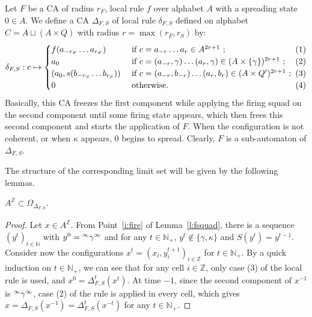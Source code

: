 \documentclass{jac}
\newcommand{\Z}{\mathbb Z}
\newcommand{\N}{\mathbb N}
\newcommand{\Ns}{\N_+}
\newcommand{\az}{{A^\Z}}
\newcommand{\dinf}[1]{\vphantom{#1}^\infty{#1}^\infty}
\theoremstyle{definition}
\begin{document}
Let $F$ be a CA of radius $r_F$, local rule $f$ over alphabet $A$ with a
spreading state $0\in A$. We define a CA $\Delta_{F,S}$ of local rule
$\delta_{F,S}$ defined on alphabet $C=A\sqcup(A\times Q)$ with radius
$r=\max(r_F,r_S)$ by:
\[
\delta_{F,S}:c\mapsto
    \begin{cases}
      f(a_{-r_F}\ldots a_{r_F})&\text{ if }c=a_{-r}\ldots a_r\in A^{2r+1}~;\hfill \text{ (1)}\\
      a_0&\text{ if }c=(a_{-r},\gamma)\ldots(a_r,\gamma)\in(A\times\{\gamma\})^{2r+1}~;\hfill \text{ (2)}\\
      (a_0,s(b_{-r_S}\ldots b_{r_S}))&\text{ if }c=(a_{-r},b_{-r})\ldots(a_r,b_r)\in(A\times Q')^{2r+1}~;\hfill \text{ (3)}\\
      0&\text{ otherwise}.\hfill \text{ (4)}
    \end{cases}
\]
Basically, this CA freezes the first component while applying the firing squad on the second component until some firing state appears, which then frees this second component and starts the application of $F$. When the configuration is not coherent, or when $\kappa$ appears, $0$ begins to spread.
Clearly, $F$ is a sub-automaton of $\Delta_{F,S}$.

The structure of the corresponding limit set will be given by the following lemmas.
\begin{lem}\label{l:sigomeg}
$\az\subset\Omega_{\Delta_{F,S}}$.
\end{lem}
\begin{proof}
Let $x\in\az$. From Point~\ref{i:fire} of Lemma~\ref{l:fsquad}, there is a sequence $(y^t)_{t\in\N}$ with $y^0=\dinf\gamma$ and for any $t\in\Ns$, $y^t\notin\{\gamma,\kappa\}$ and $S(y^t)=y^{t-1}$.
Consider now the configurations $x^t=(x_i,y^{t+1}_i)_{i\in\Z}$ for $t\in\Ns$.
By a quick induction on $t\in\Ns$, we can see that for any cell $i\in\Z$, only case (3) of the local rule is used, and $x^0=\Delta_{F,S}^t(x^t)$. At time $-1$, since the second component of $x^{-1}$ is $\dinf\gamma$, case (2) of the rule is applied in every cell, which gives $x=\Delta_{F,S}(x^{-1})=\Delta_{F,S}^t(x^{-t})$ for any $t\in\Ns$.
\end{proof}
\end{document}
